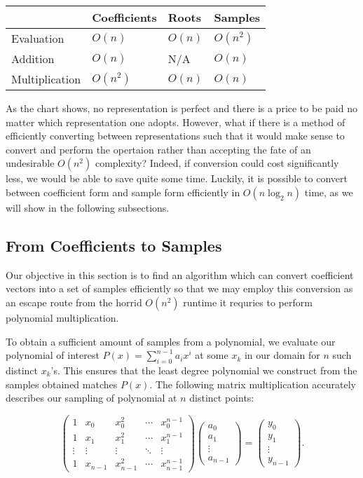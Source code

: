 \documentclass[12pt]{article}
\begin{document}
\begin{tabular}{|p{2.8cm}||p{2cm}|p{2cm}|p{2cm}|}
\hline
&Coefficients&Roots&Samples\\
\hline\hline
Evaluation&$O(n)$&$O(n)$&$O(n^2)$\\
\hline
Addition&$O(n)$&N/A&$O(n)$\\
\hline
Multiplication&$O(n^2)$&$O(n)$&$O(n)$\\
\hline
\end{tabular}
\medskip

As the chart shows, no representation is perfect and there is a price to be paid no matter which representation one adopts. However, what if there is a method of efficiently converting between representations such that it would make sense to convert and perform the opertaion rather than accepting the fate of an undesirable $O(n^2)$ complexity? Indeed, if conversion could cost significantly less, we would be able to save quite some time. Luckily, it is possible to convert between  coefficient form and sample form efficiently in $O(n\log_2{n})$ time, as we will show in the following subsections.

\subsection{From Coefficients to Samples}
Our objective in this section is to find an algorithm which can convert coefficient vectors into a set of samples efficiently so that we may employ this conversion as an escape route from the horrid $O(n^2)$ runtime it requries to perform polynomial multiplication.

To obtain a sufficient amount of samples from a polynomial, we evaluate our polynomial of interest $P(x) = \sum_{i=0}^{n-1} a_ix^i$ at some $x_k$ in our domain for $n$ such distinct $x_k$'s. This ensures that the least degree polynomial we construct from the samples obtained matches $P(x)$. The following matrix multiplication accurately describes our sampling of polynomial at $n$ distinct points:

\begin{equation} \label{matrix sampling}
		\begin{pmatrix}
		1 & x_0 & x_0^2 & \cdots & x_0^{n-1}\\ 
		1 & x_1 & x_1^2& \cdots & x_1^{n-1}\\ 
		\vdots & \vdots & \vdots & \ddots & \vdots\\ 
		1 & x_{n-1}  & x_{n-1}^{2}& \cdots & x_{n-1}^{n-1}
		\end{pmatrix}
		\begin{pmatrix}
		a_0\\ 
		a_1\\ 
		\vdots\\ 
		a_{n-1}
		\end{pmatrix}
		=
		\begin{pmatrix}
		y_0\\ 
		y_1\\ 
		\vdots\\ 
		y_{n-1}
		\end{pmatrix}.
\end{equation}
\end{document}
